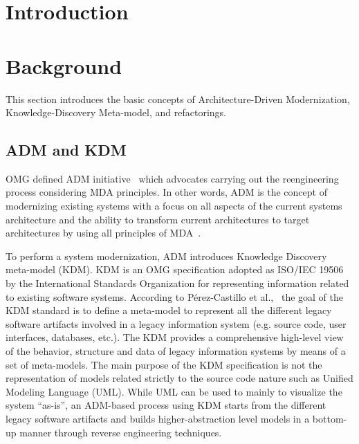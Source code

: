 \documentclass[12pt]{article}
\title{\papertitle}
\author{Rafael S. Durelli\inst{1}, Daniel S. M. Santib\'{a}\~{n}ez\inst{2} , M\'{a}rcio E. Delamaro\inst{1} \\and Valter V. de Camargo\inst{2}}
\let\cite=\citep
\begin{document}
 

\maketitle

\begin{abstract}

\end{abstract}
\section{Introduction\label{sec:introduction}}
 

% 

\section{Background\label{sec:KDM-RE}} 

This section introduces the basic concepts of Architecture-Driven Modernization, Knowledge-Discovery Meta-model, and refactorings. 

\subsection{ADM and KDM}

OMG defined ADM initiative~\cite{1686216} which advocates carrying out the reengineering process considering MDA principles. In other words, ADM is the concept of modernizing existing systems with a focus on all aspects of the current systems architecture and the ability to transform current architectures to target architectures by using all principles of MDA~\cite{Ulrich:2010:IST:1841736}.

To perform a system modernization, ADM introduces Knowledge Discovery meta-model (KDM). KDM is an OMG specification adopted as ISO/IEC 19506 by the International Standards Organization for representing information related to existing software systems. According to P\'{e}rez-Castillo et al.,~\cite{1686216} the goal of the KDM standard is to define a meta-model to represent all the different legacy software artifacts involved in a legacy information system (e.g. source code, user interfaces, databases, etc.). The KDM provides a comprehensive high-level view of the behavior, structure and data of legacy information systems by means of a set of meta-models. The main purpose of the KDM specification is not the representation of models related strictly to the source code nature such as Unified Modeling Language (UML). While UML can be used to mainly to visualize the system ``as-is'', an ADM-based process using KDM starts from the different legacy software artifacts and builds higher-abstraction level models in a bottom-up manner through reverse engineering techniques.
\end{document}
